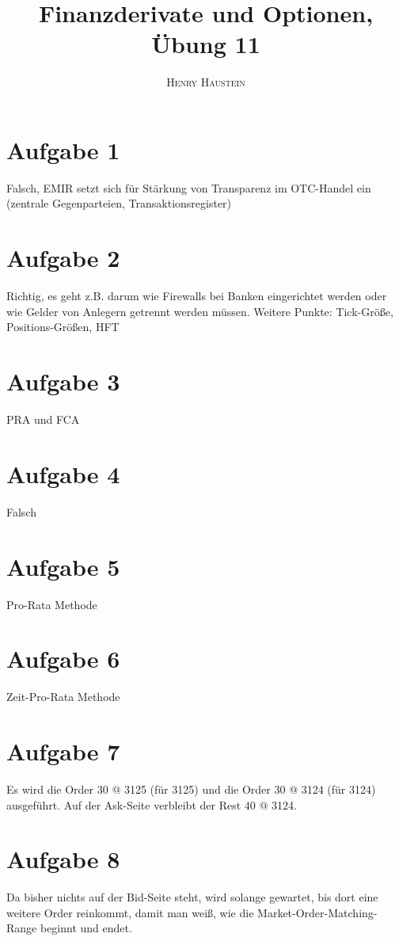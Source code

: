 \documentclass{article}
\title{\textbf{Finanzderivate und Optionen, Übung 11}}
\author{\textsc{Henry Haustein}}
\date{}
\begin{document}
	\maketitle
	
	\section*{Aufgabe 1}
	Falsch, EMIR setzt sich für Stärkung von Transparenz im OTC-Handel ein (zentrale Gegenparteien, Transaktionsregister)	

	\section*{Aufgabe 2}
	Richtig, es geht z.B. darum wie Firewalls bei Banken eingerichtet werden oder wie Gelder von Anlegern getrennt werden müssen. Weitere Punkte: Tick-Größe, Positions-Größen, HFT
	
	\section*{Aufgabe 3}
	PRA und FCA
	
	\section*{Aufgabe 4}
	Falsch
	
	\section*{Aufgabe 5}
	Pro-Rata Methode
	
	\section*{Aufgabe 6}
	Zeit-Pro-Rata Methode
	
	\section*{Aufgabe 7}
	Es wird die Order 30 @ 3125 (für 3125) und die Order 30 @ 3124 (für 3124) ausgeführt. Auf der Ask-Seite verbleibt der Rest 40 @ 3124.
	
	\section*{Aufgabe 8}
	Da bisher nichts auf der Bid-Seite steht, wird solange gewartet, bis dort eine weitere Order reinkommt, damit man weiß, wie die Market-Order-Matching-Range beginnt und endet.
	
\end{document}
